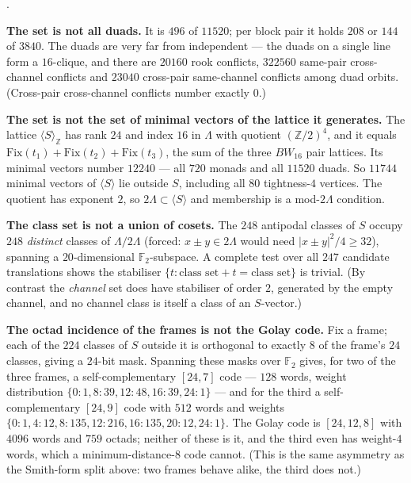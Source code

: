 \documentclass[10pt,a4paper]{article}
\newcounter{tightenum}
\newenvironment{tightenum}%
  {\begin{list}{\arabic{tightenum}.}{\usecounter{tightenum}%
     \setlength{\leftmargin}{1.8em}\setlength{\labelwidth}{1.2em}%
     \setlength{\labelsep}{0.6em}\setlength{\itemsep}{4pt}%
     \setlength{\topsep}{4pt}\setlength{\parsep}{0pt}}}%
  {\end{list}}
\newcommand{\Lam}{\Lambda}
\begin{document}
\begin{tightenum}
\item \textbf{The set is not all duads.} It is $496$ of $11520$; per block pair it holds $208$ or
  $144$ of $3840$. The duads are very far from independent --- the duads on a single line form a
  $16$-clique, and there are $20160$ rook conflicts, $322560$ same-pair cross-channel conflicts and
  $23040$ cross-pair same-channel conflicts among duad orbits. (Cross-pair cross-channel conflicts
  number exactly $0$.)
\item \textbf{The set is not the set of minimal vectors of the lattice it generates.} The lattice
  $\langle S\rangle_{\mathbb{Z}}$ has rank $24$ and index $16$ in $\Lam$ with quotient
  $(\mathbb{Z}/2)^4$, and it equals $\mathrm{Fix}(t_1) + \mathrm{Fix}(t_2) + \mathrm{Fix}(t_3)$, the
  sum of the three $BW_{16}$ pair lattices. Its minimal vectors number $12240$ --- all $720$ monads
  and all $11520$ duads. So $11744$ minimal vectors of $\langle S \rangle$ lie outside $S$,
  including all $80$ tightness-$4$ vertices. The quotient has exponent $2$, so $2\Lam \subset
  \langle S\rangle$ and membership is a mod-$2\Lam$ condition.
\item \textbf{The class set is not a union of cosets.} The $248$ antipodal classes of $S$ occupy
  $248$ \emph{distinct} classes of $\Lam/2\Lam$ (forced: $x \pm y \in 2\Lam$ would need
  $|x\pm y|^2/4 \ge 32$), spanning a $20$-dimensional $\mathbb{F}_2$-subspace. A complete test over
  all $247$ candidate translations shows the stabiliser $\{t : \text{class set} + t = \text{class
  set}\}$ is trivial. (By contrast the \emph{channel} set does have stabiliser of order $2$,
  generated by the empty channel, and no channel class is itself a class of an $S$-vector.)
\item \textbf{The octad incidence of the frames is not the Golay code.} Fix a frame; each of the
  $224$ classes of $S$ outside it is orthogonal to exactly $8$ of the frame's $24$ classes, giving a
  $24$-bit mask. Spanning these masks over $\mathbb{F}_2$ gives, for two of the three frames, a
  self-complementary $[24,7]$ code --- $128$ words, weight distribution
  $\{0{:}1, 8{:}39, 12{:}48, 16{:}39, 24{:}1\}$ --- and for the third a self-complementary
  $[24,9]$ code with $512$ words and weights $\{0{:}1,4{:}12,8{:}135,12{:}216,16{:}135,20{:}12,24{:}1\}$.
  The Golay code is $[24,12,8]$ with $4096$ words and $759$ octads; neither of these is it, and the
  third even has weight-$4$ words, which a minimum-distance-$8$ code cannot. (This is the same
  asymmetry as the Smith-form split above: two frames behave alike, the third does not.)

\end{tightenum}
\end{document}
